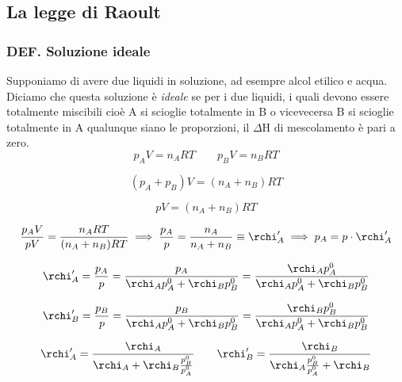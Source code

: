 \subsection{La legge di Raoult}
\subsubsection{DEF. Soluzione ideale}
Supponiamo di avere due liquidi in soluzione, ad esempre alcol etilico e acqua. Diciamo che questa soluzione è \textit{ideale} se per i due liquidi, i quali devono essere totalmente miscibili cioè A si scioglie totalmente in B o vicevecersa B si scioglie totalmente in A qualunque siano le proporzioni, il $\Delta$H di mescolamento è pari a zero.
$$p_AV=n_ART
\qquad
p_BV=n_BRT$$

$$(p_A + p_B)V= (n_A + n_B)RT$$

$$pV=(n_A + n_B)RT$$

$$\frac{p_AV}{pV}= \frac{n_ART}{(n_A + n_B)RT}
\implies
\frac{p_A}{p} = \frac{n_A}{n_A + n_B}\equiv \rchi '_A
\implies
p_A=p \cdot \rchi '_A$$

$$\rchi '_A=\frac{p_A}{p}=
\frac{p_A}{\rchi_A p_A^0 + \rchi_B p_B^0}=
\frac{\rchi_A p_A^0}{\rchi_A p_A^0 + \rchi_B p_B^0}$$

$$\rchi '_B=\frac{p_B}{p}=
\frac{p_B}{\rchi_A p_A^0 + \rchi_B p_B^0}=
\frac{\rchi_B p_B^0}{\rchi_A p_A^0 + \rchi_B p_B^0}$$

$$\rchi'_A=\frac{\rchi_A}{\rchi_A + \rchi_B\frac{p^0_B}{p^0_A}}
\qquad
\rchi'_B=\frac{\rchi_B}{\rchi_A\frac{p^0_B}{p^0_A} + \rchi_B}$$